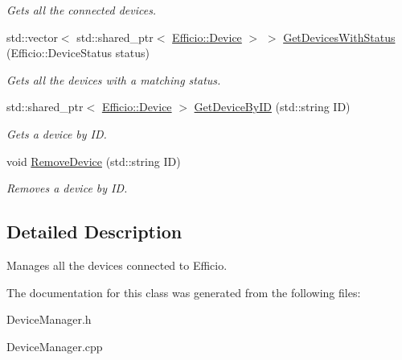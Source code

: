 \begin{DoxyCompactItemize}
\begin{DoxyCompactList}\small\item\em Gets all the connected devices. \end{DoxyCompactList}\item 
std\+::vector$<$ std\+::shared\+\_\+ptr$<$ \hyperlink{class_efficio_1_1_device}{Efficio\+::\+Device} $>$ $>$ \hyperlink{class_efficio_1_1_device_manager_a91a1c03cfe7f4268e9ed5ad0350b4a57}{Get\+Devices\+With\+Status} (Efficio\+::\+Device\+Status status)\hypertarget{class_efficio_1_1_device_manager_a91a1c03cfe7f4268e9ed5ad0350b4a57}{}\label{class_efficio_1_1_device_manager_a91a1c03cfe7f4268e9ed5ad0350b4a57}

\begin{DoxyCompactList}\small\item\em Gets all the devices with a matching status. \end{DoxyCompactList}\item 
std\+::shared\+\_\+ptr$<$ \hyperlink{class_efficio_1_1_device}{Efficio\+::\+Device} $>$ \hyperlink{class_efficio_1_1_device_manager_aeae743bb7d5d973f3245ae69d468befd}{Get\+Device\+By\+ID} (std\+::string ID)\hypertarget{class_efficio_1_1_device_manager_aeae743bb7d5d973f3245ae69d468befd}{}\label{class_efficio_1_1_device_manager_aeae743bb7d5d973f3245ae69d468befd}

\begin{DoxyCompactList}\small\item\em Gets a device by ID. \end{DoxyCompactList}\item 
void \hyperlink{class_efficio_1_1_device_manager_adaf266b0b68312621e331f2eb672c9cc}{Remove\+Device} (std\+::string ID)\hypertarget{class_efficio_1_1_device_manager_adaf266b0b68312621e331f2eb672c9cc}{}\label{class_efficio_1_1_device_manager_adaf266b0b68312621e331f2eb672c9cc}

\begin{DoxyCompactList}\small\item\em Removes a device by ID. \end{DoxyCompactList}\end{DoxyCompactItemize}


\subsection{Detailed Description}
Manages all the devices connected to Efficio. 

The documentation for this class was generated from the following files\+:\begin{DoxyCompactItemize}
\item 
Device\+Manager.\+h\item 
Device\+Manager.\+cpp\end{DoxyCompactItemize}
